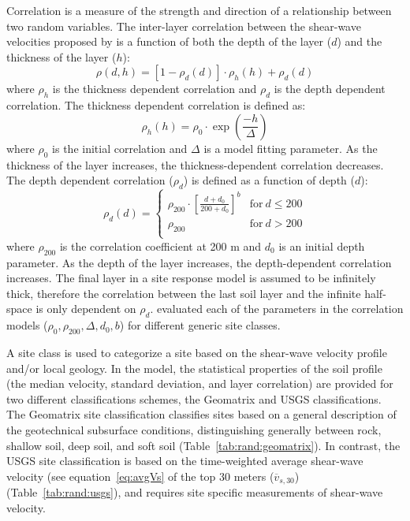 \documentclass[12pt,oneside]{book}
\begin{document}
Correlation is a measure of the strength and direction of a relationship between two random
variables.  The inter-layer correlation between the shear-wave velocities proposed by
\citet{toro:95} is a function of both the depth of the layer ($d$) and the thickness of the layer
($h$):
\begin{equation}
    \rho(d,h) = \left[1 - \rho_d(d)\right] \cdot \rho_h(h) + \rho_d(d)
\end{equation}
where $\rho_h$ is the thickness dependent correlation and $\rho_d$ is the depth dependent
correlation.  The thickness dependent correlation is defined as:
\begin{equation}
    \rho_h(h) = \rho_0 \cdot \exp\left(\frac{-h}{\Delta}\right)
\end{equation}
where $\rho_0$ is the initial correlation and $\Delta$ is a model fitting parameter.  As the
thickness of the layer increases, the thickness-dependent correlation decreases.  The depth
dependent correlation ($\rho_d$) is defined as a function of depth ($d$): 
\begin{equation}
    \rho_d(d) = 
    \left\{
        \begin{array}{ll}
            \rho_{200} \cdot \left[ \frac{d+d_0}{200+d_0} \right]^b & \mathrm{for}\ d \leq 200 \\
            \rho_{200} & \mathrm{for}\ d > 200 \\
        \end{array}
    \right. 
\end{equation}
where $\rho_{200}$ is the correlation coefficient at 200 m and $d_0$ is an initial depth parameter.
As the depth of the layer increases, the depth-dependent correlation increases.  The final layer in
a site response model is assumed to be infinitely thick, therefore the correlation between the last
soil layer and the infinite half-space is only dependent on $\rho_d$.  \citep{toro:95} evaluated
each of the parameters in the correlation models ($\rho_0, \rho_{200}, \Delta, d_0, b$) for
different generic site classes.

A site class is used to categorize a site based on the shear-wave velocity profile and/or local
geology.  In the \citet{toro:95} model, the statistical properties of the soil profile (the median
velocity, standard deviation, and layer correlation) are provided for two different classifications
schemes, the Geomatrix and USGS classifications. The Geomatrix site classification classifies sites
based on a general description of the geotechnical subsurface conditions, distinguishing generally
between rock, shallow soil, deep soil, and soft soil (Table~\ref{tab:rand:geomatrix}).  In contrast,
the USGS site classification is based on the time-weighted average shear-wave velocity (see
equation~\ref{eq:avgVs} of the top 30 meters ($\overline{v}_{s,30}$) (Table~\ref{tab:rand:usgs}),
and requires site specific measurements of shear-wave velocity.
\end{document}
